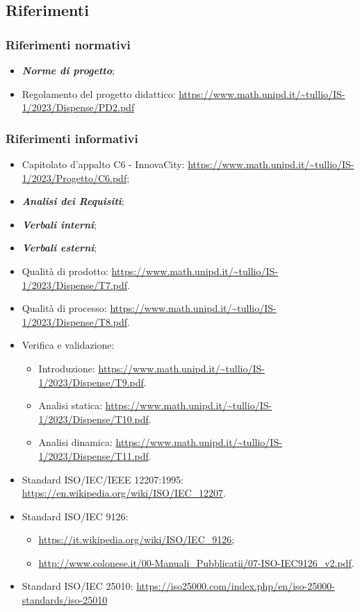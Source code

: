 \subsection{Riferimenti}
\subsubsection{Riferimenti normativi}
\begin{itemize}
    \item \textbf{\textit{Norme di progetto}};
    \item Regolamento del progetto didattico: \url{https://www.math.unipd.it/~tullio/IS-1/2023/Dispense/PD2.pdf}
\end{itemize}
\subsubsection{Riferimenti informativi}
\begin{itemize}
    \item Capitolato d’appalto C6 - InnovaCity: \url{https://www.math.unipd.it/~tullio/IS-1/2023/Progetto/C6.pdf};
    \item \textbf{\textit{Analisi dei Requisiti}};
    \item \textbf{\textit{Verbali interni}};
    \item \textbf{\textit{Verbali esterni}};
    \item Qualità di prodotto: \url{https://www.math.unipd.it/~tullio/IS-1/2023/Dispense/T7.pdf}.
    \item Qualità di processo: \url{https://www.math.unipd.it/~tullio/IS-1/2023/Dispense/T8.pdf}.
    \item Verifica e validazione: \begin{itemize}
    \item Introduzione: \url{https://www.math.unipd.it/~tullio/IS-1/2023/Dispense/T9.pdf}.
    \item Analisi statica: \url{https://www.math.unipd.it/~tullio/IS-1/2023/Dispense/T10.pdf}.
    \item Analisi dinamica: \url{https://www.math.unipd.it/~tullio/IS-1/2023/Dispense/T11.pdf}.
    \end{itemize}
    \item Standard ISO/IEC/IEEE 12207:1995: \url{https://en.wikipedia.org/wiki/ISO/IEC_12207}.
    \item Standard ISO/IEC 9126: \begin{itemize}
        \item \url{https://it.wikipedia.org/wiki/ISO/IEC_9126};
        \item \url{http://www.colonese.it/00-Manuali_Pubblicatii/07-ISO-IEC9126_v2.pdf}.
    \end{itemize}
    \item Standard ISO/IEC 25010: \url{https://iso25000.com/index.php/en/iso-25000-standards/iso-25010}
\end{itemize}
